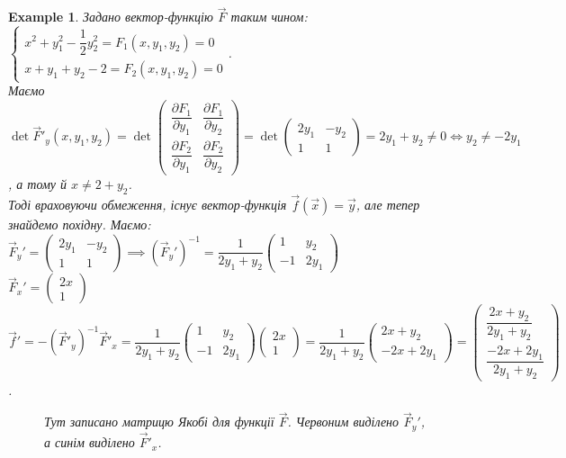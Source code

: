 \documentclass[a4paper, 10pt]{article}
\def\departial#1#2{\dfrac{\partial {#1}}{\partial {#2}}}
\theoremstyle{theoremdd}
\theoremstyle{theoremdd}
\theoremstyle{theoremdd}
\theoremstyle{theoremdd}
\theoremstyle{theoremdd}
\newtheorem{example}[theorem]{Example}
\theoremstyle{theoremdd}
\theoremstyle{theoremdd}
\theoremstyle{theoremdd}
\theoremstyle{theoremdd}
\begin{document}
\begin{example}
Задано вектор-функцію $\vec{F}$ таким чином: $\begin{cases}
x^2+y_1^2 - \dfrac{1}{2}y_2^2 = F_1(x,y_1,y_2) = 0 \\
x+y_1+y_2-2 = F_2(x,y_1,y_2) = 0
\end{cases}$.\\
Маємо $\det \vec{F}'_y(x,y_1,y_2) = \det \begin{pmatrix}
\departial{F_1}{y_1} & \departial{F_1}{y_2} \\
\departial{F_2}{y_1} & \departial{F_2}{y_2} 
\end{pmatrix} = \det \begin{pmatrix}
2y_1 & -y_2 \\
1 & 1
\end{pmatrix} = 2y_1 + y_2 \neq 0 \iff y_2 \neq -2y_1$, а тому й $x \neq 2+y_2$.\\
Тоді враховуючи обмеження, існує вектор-функція $\vec{f}(\vec{x}) = \vec{y}$, але тепер знайдемо похідну. Маємо: \\
$\vec{F}_y' = \begin{pmatrix}
2y_1 & -y_2 \\
1 & 1
\end{pmatrix} \implies (\vec{F}_y')^{-1} = \dfrac{1}{2y_1+y_2} \begin{pmatrix}
1 & y_2 \\
-1 & 2y_1
\end{pmatrix}$\\
$\vec{F}_x' = \begin{pmatrix}
2x \\ 1
\end{pmatrix}$\\
$\vec{f}' = -(\vec{F}'_y)^{-1} \vec{F}'_x = \dfrac{1}{2y_1+y_2} \begin{pmatrix}
1 & y_2 \\
-1 & 2y_1
\end{pmatrix} \begin{pmatrix}
2x \\ 1
\end{pmatrix} = \dfrac{1}{2y_1+y_2} \begin{pmatrix}
2x + y_2 \\ -2x + 2y_1
\end{pmatrix} = \begin{pmatrix}
\dfrac{2x+y_2}{2y_1+y_2} \\ \dfrac{-2x+2y_1}{2y_1+y_2}
\end{pmatrix}$.
\begin{figure}[H]
\centering
{}
\caption*{Тут записано матрицю Якобі для функції $\vec{F}$. Червоним виділено $\vec{F}_y'$, а синім виділено $\vec{F}'_x$.}
\end{figure}
\end{example}
\end{document}
